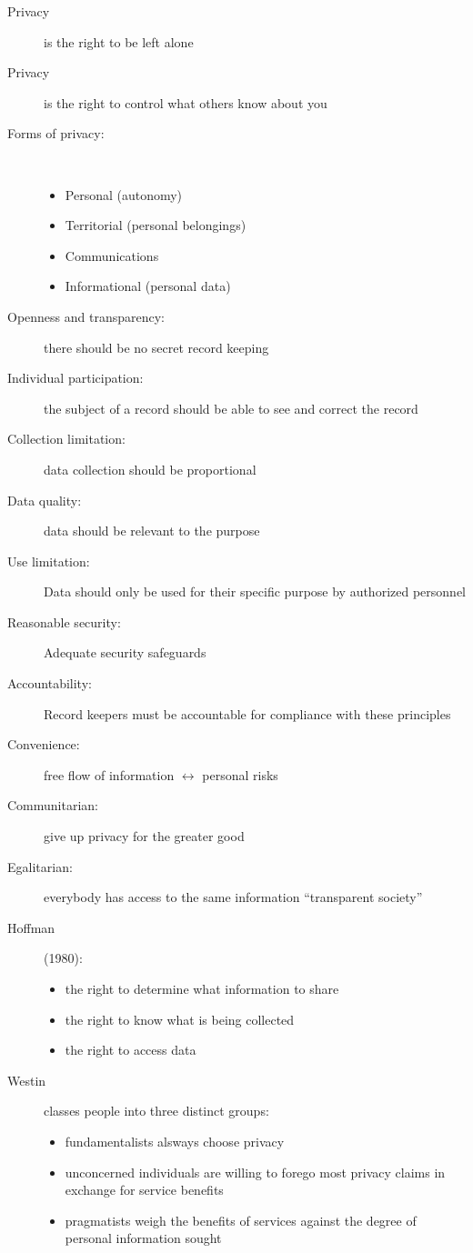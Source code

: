 \documentclass[a4paper]{article}
\begin{document}
\begin{description}
\item[Privacy] is the right to be left alone
\item[Privacy] is the right to control what others know about you
\item[Forms of privacy:] ~
\begin{itemize}
\item Personal (autonomy)
\item Territorial (personal belongings)
\item Communications
\item Informational (personal data)
\end{itemize}
\item[Openness and transparency:] there should be no secret record keeping
\item[Individual participation:] the subject of a record should be able to see and correct the record
\item[Collection limitation:] data collection should be proportional
\item[Data quality:] data should be relevant to the purpose
\item[Use limitation:] Data should only be used for their specific purpose by authorized personnel
\item[Reasonable security:] Adequate security safeguards
\item[Accountability:] Record keepers must be accountable for compliance with these principles
\item[Convenience:] free flow of information $\leftrightarrow$ personal risks
\item[Communitarian:] give up privacy for the greater good
\item[Egalitarian:] everybody has access to the same information ``transparent society''
\item[Hoffman] (1980):
\begin{itemize}
\item the right to determine what information to share
\item the right to know what is being collected
\item the right to access data
\end{itemize}
\item[Westin] classes people into three distinct groups:
\begin{itemize}
\item fundamentalists alsways choose privacy
\item unconcerned individuals are willing to forego most privacy claims in exchange for service benefits
\item pragmatists weigh the benefits of services against the degree of personal information sought
\end{itemize}
\end{description}
\end{document}
